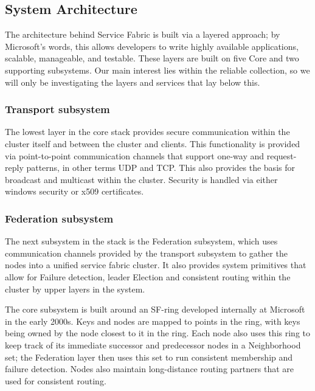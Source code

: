 \documentclass[a4paper,10pt,titlepage]{report}
\begin{document}
    \subsection{System Architecture}

    The architecture behind Service Fabric is built via a layered approach; by Microsoft's words, this allows developers to write highly available applications, scalable, manageable, and testable. These layers are built on five Core and two supporting subsystems. Our main interest lies within the reliable collection, so we will only be investigating the layers and services that lay below this.\\
    \vspace{5mm}

    \subsubsection{Transport subsystem}
    The lowest layer in the core stack provides secure communication within the cluster itself and between the cluster and clients. This functionality is provided via point-to-point communication channels that support one-way and request-reply patterns, in other terms UDP and TCP. This also provides the basis for broadcast and multicast within the cluster. Security is handled via either windows security or x509 certificates. \\
    \vspace{5mm}

    \subsubsection{Federation subsystem}

    The next subsystem in the stack is the Federation subsystem, which uses communication channels provided by the transport subsystem to gather the nodes into a unified service fabric cluster. It also provides system primitives that allow for Failure detection, leader Election and consistent routing within the cluster by upper layers in the system.\\
    \vspace{5mm}

    The core subsystem is built around an SF-ring developed internally at Microsoft in the early 2000s. Keys and nodes are mapped to points in the ring, with keys being owned by the node closest to it in the ring. Each node also uses this ring to keep track of its immediate successor and predecessor nodes in a Neighborhood set; the Federation layer then uses this set to run consistent membership and failure detection. Nodes also maintain long-distance routing partners that are used for consistent routing.\\
    \vspace{5mm}
\end{document}
